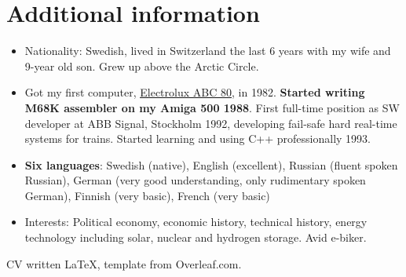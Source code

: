 \documentclass[a4paper,11pt]{article}
\newcommand{\resumeItem}[1]{
  \item\small{#1}
}
\newcommand{\resumeItemListStart}{\begin{itemize}[rightmargin=0.11in]}
\newcommand{\resumeItemListEnd}{\end{itemize}}
\begin{document}
\section{Additional information}
\resumeItemListStart{}

    \resumeItem{Nationality: Swedish, lived in Switzerland the last 6 years
      with my wife and 9-year old son. Grew up above the Arctic Circle.}

    \resumeItem{Got my first computer,
      \href{https://en.wikipedia.org/wiki/ABC_80}{\uline{Electrolux ABC 80}},
      in 1982. \textbf{Started writing M68K assembler on my Amiga 500
        1988}. First full-time position as SW developer at ABB Signal,
      Stockholm 1992, developing fail-safe hard real-time systems for
      trains. Started learning and using C++ professionally 1993.}

    \resumeItem{\textbf{Six languages}: Swedish (native), English (excellent),
      Russian (fluent spoken Russian), German (very good understanding, only
      rudimentary spoken German), Finnish (very basic), French (very basic)}

    \resumeItem{Interests: Political economy, economic history, technical
      history, energy technology including solar, nuclear and hydrogen
      storage. Avid e-biker.}  \resumeItemListEnd{}

CV written LaTeX, template from Overleaf.com.
\end{document}
